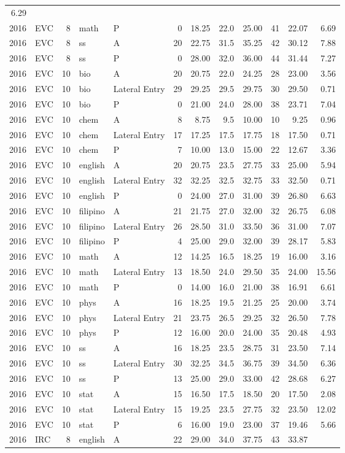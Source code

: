 \documentclass[]{article}
\begin{document}
\begin{longtable}[]{@{}rlrllrrrrrrr@{}}
6.29\tabularnewline
2016 & EVC & 8 & math & P & 0 & 18.25 & 22.0 & 25.00 & 41 & 22.07 &
6.69\tabularnewline
2016 & EVC & 8 & ss & A & 20 & 22.75 & 31.5 & 35.25 & 42 & 30.12 &
7.88\tabularnewline
2016 & EVC & 8 & ss & P & 0 & 28.00 & 32.0 & 36.00 & 44 & 31.44 &
7.27\tabularnewline
2016 & EVC & 10 & bio & A & 20 & 20.75 & 22.0 & 24.25 & 28 & 23.00 &
3.56\tabularnewline
2016 & EVC & 10 & bio & Lateral Entry & 29 & 29.25 & 29.5 & 29.75 & 30 &
29.50 & 0.71\tabularnewline
2016 & EVC & 10 & bio & P & 0 & 21.00 & 24.0 & 28.00 & 38 & 23.71 &
7.04\tabularnewline
2016 & EVC & 10 & chem & A & 8 & 8.75 & 9.5 & 10.00 & 10 & 9.25 &
0.96\tabularnewline
2016 & EVC & 10 & chem & Lateral Entry & 17 & 17.25 & 17.5 & 17.75 & 18
& 17.50 & 0.71\tabularnewline
2016 & EVC & 10 & chem & P & 7 & 10.00 & 13.0 & 15.00 & 22 & 12.67 &
3.36\tabularnewline
2016 & EVC & 10 & english & A & 20 & 20.75 & 23.5 & 27.75 & 33 & 25.00 &
5.94\tabularnewline
2016 & EVC & 10 & english & Lateral Entry & 32 & 32.25 & 32.5 & 32.75 &
33 & 32.50 & 0.71\tabularnewline
2016 & EVC & 10 & english & P & 0 & 24.00 & 27.0 & 31.00 & 39 & 26.80 &
6.63\tabularnewline
2016 & EVC & 10 & filipino & A & 21 & 21.75 & 27.0 & 32.00 & 32 & 26.75
& 6.08\tabularnewline
2016 & EVC & 10 & filipino & Lateral Entry & 26 & 28.50 & 31.0 & 33.50 &
36 & 31.00 & 7.07\tabularnewline
2016 & EVC & 10 & filipino & P & 4 & 25.00 & 29.0 & 32.00 & 39 & 28.17 &
5.83\tabularnewline
2016 & EVC & 10 & math & A & 12 & 14.25 & 16.5 & 18.25 & 19 & 16.00 &
3.16\tabularnewline
2016 & EVC & 10 & math & Lateral Entry & 13 & 18.50 & 24.0 & 29.50 & 35
& 24.00 & 15.56\tabularnewline
2016 & EVC & 10 & math & P & 0 & 14.00 & 16.0 & 21.00 & 38 & 16.91 &
6.61\tabularnewline
2016 & EVC & 10 & phys & A & 16 & 18.25 & 19.5 & 21.25 & 25 & 20.00 &
3.74\tabularnewline
2016 & EVC & 10 & phys & Lateral Entry & 21 & 23.75 & 26.5 & 29.25 & 32
& 26.50 & 7.78\tabularnewline
2016 & EVC & 10 & phys & P & 12 & 16.00 & 20.0 & 24.00 & 35 & 20.48 &
4.93\tabularnewline
2016 & EVC & 10 & ss & A & 16 & 18.25 & 23.5 & 28.75 & 31 & 23.50 &
7.14\tabularnewline
2016 & EVC & 10 & ss & Lateral Entry & 30 & 32.25 & 34.5 & 36.75 & 39 &
34.50 & 6.36\tabularnewline
2016 & EVC & 10 & ss & P & 13 & 25.00 & 29.0 & 33.00 & 42 & 28.68 &
6.27\tabularnewline
2016 & EVC & 10 & stat & A & 15 & 16.50 & 17.5 & 18.50 & 20 & 17.50 &
2.08\tabularnewline
2016 & EVC & 10 & stat & Lateral Entry & 15 & 19.25 & 23.5 & 27.75 & 32
& 23.50 & 12.02\tabularnewline
2016 & EVC & 10 & stat & P & 6 & 16.00 & 19.0 & 23.00 & 37 & 19.46 &
5.66\tabularnewline
2016 & IRC & 8 & english & A & 22 & 29.00 & 34.0 & 37.75 & 43 & 33.87 &

\end{longtable}
\end{document}
